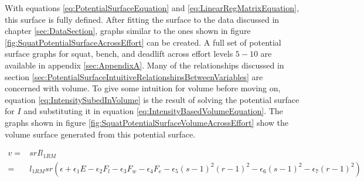 With equations \ref{eq:PotentialSurfaceEquation} and \ref{eq:LinearRegMatrixEquation}, this surface is fully defined. After fitting the surface to the data discussed in chapter \ref{sec:DataSection}, graphs similar to the ones shown in figure \ref{fig:SquatPotentialSurfaceAcrossEffort} can be created. A full set of potential surface graphs for squat, bench, and deadlift across effort levels $5-10$ are available in appendix \ref{sec:AppendixA}. Many of the relationships discussed in section \ref{sec:PotentialSurfaceIntuitiveRelationshipsBetweenVariables} are concerned with volume. To give some intuition for volume before moving on, equation \ref{eq:IntensitySubedInVolume} is the result of solving the potential surface for $I$ and substituting it in equation \ref{eq:IntensityBasedVolumeEquation}. The graphs shown in figure \ref{fig:SquatPotentialSurfaceVolumeAcrossEffort} show the volume surface generated from this potential surface.

\begin{equation}
    \label{eq:IntensitySubedInVolume}
    \begin{split}
    		v = & srI l_{1RM} \\
    			= & l_{1RM} sr \left( 
    			\epsilon+
    			\epsilon_1 E-
    			\epsilon_2 F_l-
    			\epsilon_3 F_w-
    			\epsilon_4 F_e-
    			\epsilon_5(s-1)^2(r-1)^2-
    			\epsilon_6(s-1)^2-
    			\epsilon_7(r-1)^2
    		\right)
    \end{split}
\end{equation}

